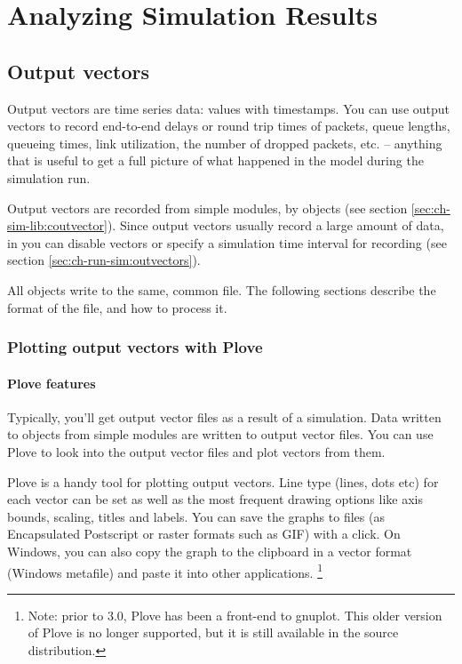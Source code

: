 \chapter{Analyzing Simulation Results}
\label{cha:analyzing-simulation-results}


\section{Output vectors}
\label{sec:ch-ana-sim:output-vectors}

Output vectors are time series data: values with timestamps.
You can use output vectors to record end-to-end delays or
round trip times of packets, queue lengths, queueing times,
link utilization, the number of dropped packets, etc. --
anything that is useful to get a full picture of what happened
in the model during the simulation run.

Output vectors are recorded from simple modules, by  objects
(see section \ref{sec:ch-sim-lib:coutvector}). Since output vectors usually
record a large amount of data, in  you can disable vectors
or specify a simulation time interval for recording
(see section \ref{sec:ch-run-sim:outvectors}).

All  objects write to the same, common file.
The following sections describe the format of the file, and
how to process it.


\subsection{Plotting output vectors with Plove}

\subsubsection{Plove features}

Typically, you'll get output vector files as a result of a simulation.
Data written to  objects from
simple modules are written to output vector
files. You can use Plove to look
into the output vector files and plot vectors from them.

Plove is a handy tool for plotting
{\opp} output vectors. Line type (lines, dots etc) for each vector can be set
as well as the most frequent drawing options like axis bounds, scaling, titles
and labels. You can save the graphs to files (as Encapsulated Postscript or
raster formats such as GIF) with a click. On Windows, you can also
copy the graph to the clipboard in a vector format (Windows metafile)
and paste it into other applications.
    \footnote{Note: prior to {\opp} 3.0, Plove has been a front-end to
    gnuplot. This older version of Plove is no longer supported, but it is still
    available in the {\opp} source distribution.}

